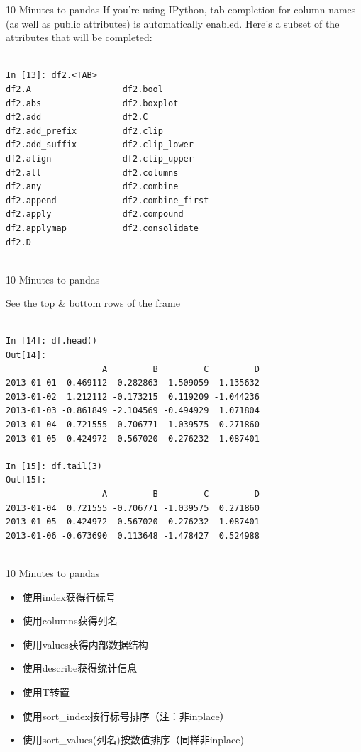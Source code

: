 \documentclass{beamer}
\begin{document}
\begin{frame}[t,fragile]{10 Minutes to pandas}
If you’re using IPython, tab completion for column names (as well as public
attributes) is automatically enabled. Here’s a subset of the attributes that
will be completed:


	\scriptsize
\begin{verbatim}

In [13]: df2.<TAB>
df2.A                  df2.bool
df2.abs                df2.boxplot
df2.add                df2.C
df2.add_prefix         df2.clip
df2.add_suffix         df2.clip_lower
df2.align              df2.clip_upper
df2.all                df2.columns
df2.any                df2.combine
df2.append             df2.combine_first
df2.apply              df2.compound
df2.applymap           df2.consolidate
df2.D


\end{verbatim}


\end{frame}


\begin{frame}[t,fragile]{10 Minutes to pandas}

See the top \& bottom rows of the frame

	\scriptsize
\begin{verbatim}

In [14]: df.head()
Out[14]: 
                   A         B         C         D
2013-01-01  0.469112 -0.282863 -1.509059 -1.135632
2013-01-02  1.212112 -0.173215  0.119209 -1.044236
2013-01-03 -0.861849 -2.104569 -0.494929  1.071804
2013-01-04  0.721555 -0.706771 -1.039575  0.271860
2013-01-05 -0.424972  0.567020  0.276232 -1.087401

In [15]: df.tail(3)
Out[15]: 
                   A         B         C         D
2013-01-04  0.721555 -0.706771 -1.039575  0.271860
2013-01-05 -0.424972  0.567020  0.276232 -1.087401
2013-01-06 -0.673690  0.113648 -1.478427  0.524988


\end{verbatim}


\end{frame}


\begin{frame}[t]{10 Minutes to pandas}
\begin{itemize}
	\item 使用index获得行标号
	\item 使用columns获得列名
	\item 使用values获得内部数据结构
	\item 使用describe获得统计信息
	\item 使用T转置
	\item 使用sort\_index按行标号排序（注：非inplace）
	\item 使用sort\_values(列名)按数值排序（同样非inplace)
\end{itemize}


\end{frame}
\end{document}
